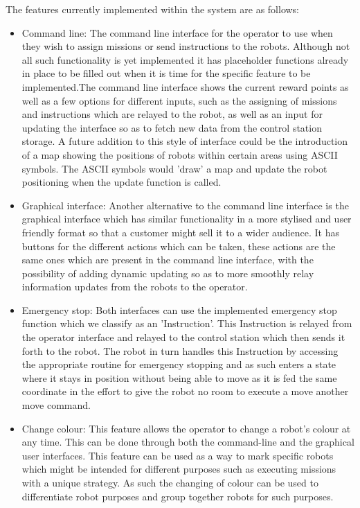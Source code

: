 The features currently implemented within the system are as follows:
\begin{itemize}
    \item Command line: The command line interface for the operator to use when they wish to assign missions or send instructions to the robots. Although not all such functionality is yet implemented it has placeholder functions already in place to be filled out when it is time for the specific feature to be implemented.\newline The command line interface shows the current reward points as well as a few options for different inputs, such as the assigning of missions and instructions which are relayed to the robot, as well as an input for updating the interface so as to fetch new data from the control station storage.
    A future addition to this style of interface could be the introduction of a map showing the positions of robots within certain areas using ASCII symbols. The ASCII symbols would 'draw' a map and update the robot positioning when the update function is called.
    \item Graphical interface: Another alternative to the command line interface is the graphical interface which has similar functionality in a more stylised and user friendly format so that a customer might sell it to a wider audience. It has buttons for the different actions which can be taken, these actions are the same ones which are present in the command line interface, with the possibility of adding dynamic updating so as to more smoothly relay information updates from the robots to the operator.
    \item Emergency stop: Both interfaces can use the implemented emergency stop function which we classify as an 'Instruction'. This Instruction is relayed from the operator interface and relayed to the control station which then sends it forth to the robot. The robot in turn handles this Instruction by accessing the appropriate routine for emergency stopping and as such enters a state where it stays in position without being able to move as it is fed the same coordinate in the effort to give the robot no room to execute a move another move command.
    \item Change colour: This feature allows the operator to change a robot's colour at any time. This can be done through both the command-line and the graphical user interfaces. This feature can be used as a way to mark specific robots which might be intended for different purposes such as executing missions with a unique strategy. As such the changing of colour can be used to differentiate robot purposes and group together robots for such purposes.
    
\end{itemize}


